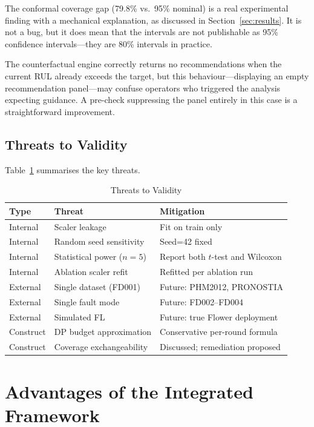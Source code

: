 \documentclass[10pt, journal, letterpaper]{IEEEtran}
\begin{document}
The conformal coverage gap (79.8\% vs.\ 95\% nominal) is a real experimental
finding with a mechanical explanation, as discussed in
Section~\ref{sec:results}. It is not a bug, but it does mean that the
intervals are not publishable as 95\% confidence intervals—they are 80\%
intervals in practice.

The counterfactual engine correctly returns no recommendations when the current
RUL already exceeds the target, but this behaviour—displaying an empty
recommendation panel—may confuse operators who triggered the analysis expecting
guidance. A pre-check suppressing the panel entirely in this case is a
straightforward improvement.

\subsection{Threats to Validity}

Table~\ref{tab:threats} summarises the key threats.

\begin{table}[htbp]
\caption{Threats to Validity}
\label{tab:threats}
\centering\small
\begin{tabular}{lll}
\toprule
\textbf{Type} & \textbf{Threat} & \textbf{Mitigation} \\
\midrule
Internal & Scaler leakage & Fit on train only \\
Internal & Random seed sensitivity & Seed=42 fixed \\
Internal & Statistical power ($n=5$) & Report both $t$-test and Wilcoxon \\
Internal & Ablation scaler refit & Refitted per ablation run \\
\midrule
External & Single dataset (FD001) & Future: PHM2012, PRONOSTIA \\
External & Single fault mode & Future: FD002--FD004 \\
External & Simulated FL & Future: true Flower deployment \\
\midrule
Construct & DP budget approximation & Conservative per-round formula \\
Construct & Coverage exchangeability & Discussed; remediation proposed \\
\bottomrule
\end{tabular}
\end{table}

\section{Advantages of the Integrated Framework}
\label{sec:advantages}
\end{document}
